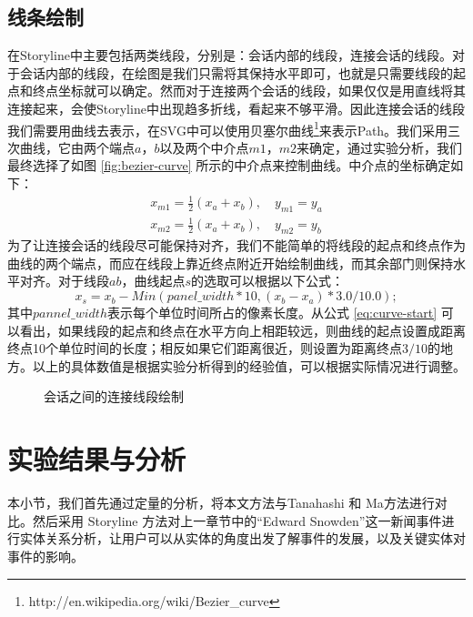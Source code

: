 \subsection{线条绘制}
在Storyline中主要包括两类线段，分别是：会话内部的线段，连接会话的线段。对于会话内部的线段，在绘图是我们只需将其保持水平即可，也就是只需要线段的起点和终点坐标就可以确定。然而对于连接两个会话的线段，如果仅仅是用直线将其连接起来，会使Storyline中出现趋多折线，看起来不够平滑。因此连接会话的线段我们需要用曲线去表示，在SVG中可以使用贝塞尔曲线\footnote{http://en.wikipedia.org/wiki/Bezier\_curve}来表示Path。我们采用三次曲线，它由两个端点$a$，$b$以及两个中介点$m1$，$m2$来确定，通过实验分析，我们最终选择了如图 \ref{fig:bezier-curve} 所示的中介点来控制曲线。中介点的坐标确定如下：
\begin{subequations}
\begin{align}
    x_{m1} = \frac{1}{2}\left ( x_a + x_b \right ), \quad y_{m1} = y_a \\
    x_{m2} = \frac{1}{2}\left ( x_a + x_b \right ), \quad y_{m2} = y_b
\end{align}
\end{subequations}
为了让连接会话的线段尽可能保持对齐，我们不能简单的将线段的起点和终点作为曲线的两个端点，而应在线段上靠近终点附近开始绘制曲线，而其余部门则保持水平对齐。对于线段$ab$，曲线起点$s$的选取可以根据以下公式：
\begin{equation}
\label{eq:curve-start}
x_s = x_b - Min(panel\_width*10, (x_b - x_a)*3.0/10.0);
\end{equation}
其中$pannel\_width$表示每个单位时间所占的像素长度。从公式 \ref{eq:curve-start} 可以看出，如果线段的起点和终点在水平方向上相距较远，则曲线的起点设置成距离终点10个单位时间的长度；相反如果它们距离很近，则设置为距离终点$3/10$的地方。以上的具体数值是根据实验分析得到的经验值，可以根据实际情况进行调整。
\begin{figure}[htb]
    \centering
    \caption{会话之间的连接线段绘制}
    \label{fig:session-space}
\end{figure}

\section{实验结果与分析}
本小节，我们首先通过定量的分析，将本文方法与Tanahashi 和 Ma\cite{tanahashi2012design}方法进行对比。然后采用 Storyline 方法对上一章节中的“Edward Snowden”这一新闻事件进行实体关系分析，让用户可以从实体的角度出发了解事件的发展，以及关键实体对事件的影响。
